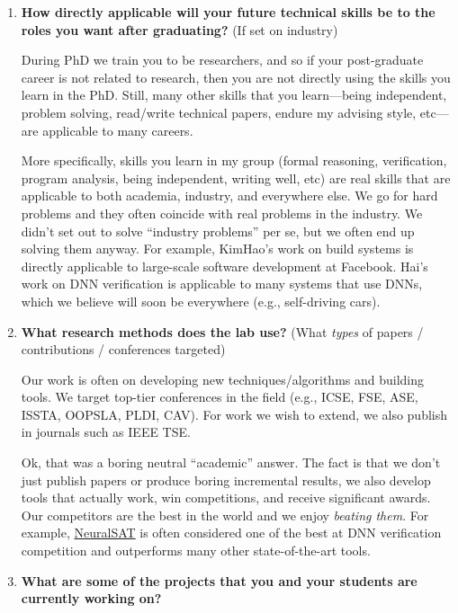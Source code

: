 \documentclass{article}
\begin{document}
\begin{enumerate}[label=\arabic*.]
    \item \textbf{How directly applicable will your future technical skills be to the roles you want after graduating?} (If set on industry) 

    During PhD we train you to be researchers, and so if your post-graduate career is not related to research, then you are not directly using the skills you learn in the PhD. Still, many other skills that you learn---being independent, problem solving, read/write technical papers, endure my advising style, etc---are applicable to many careers.

    More specifically, skills you learn in my group (formal reasoning, verification, program analysis, being independent, writing well, etc) are real skills that are applicable to both academia, industry, and everywhere else.  We go for hard problems and they often coincide with real problems in the industry. We didn't set out to solve ``industry problems'' per se, but we often end up solving them anyway. For example, KimHao's work on build systems is directly applicable to large-scale software development at Facebook. Hai's work on DNN verification is applicable to many systems that use DNNs, which we believe will soon be everywhere (e.g., self-driving cars).

    
    \item \textbf{What research methods does the lab use?} (What \textit{types} of papers / contributions / conferences targeted)  
    
    Our work is often on developing new techniques/algorithms and building tools. We target top-tier conferences in the field (e.g., ICSE, FSE, ASE, ISSTA, OOPSLA, PLDI, CAV). For work we wish to extend, we also publish in journals such as IEEE TSE.  
    
    Ok, that was a boring neutral ``academic'' answer. The fact is that we don't just publish papers or produce boring incremental results, we also develop tools that actually work, win competitions, and receive significant awards. Our competitors are the best in the world and we enjoy \emph{beating them}. For example, \href{https://code.roars.dev/neuralsat}{NeuralSAT} is often considered one of the best at DNN verification competition and outperforms many other state-of-the-art tools.

    \item \textbf{What are some of the projects that you and your students are currently working on?}  
    

\end{enumerate}
\end{document}
